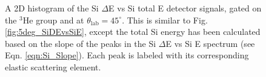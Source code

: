 \begin{figure}[t]
\caption{\label{fig:5deg_SiDEvsSiTotE}A 2D histogram of the Si $\Delta$E vs Si total E detector signals, gated on the $^{3}$He group and at $\theta_{\mathrm{lab}} = 45^{\circ}$. This is similar to Fig. \ref{fig:5deg_SiDEvsSiE}, except the total Si energy has been calculated based on the slope of the peaks in the Si $\Delta$E vs Si E spectrum (see Eqn. \ref{eqn:Si_Slope}). Each peak is labeled with its corresponding elastic scattering element.}
\end{figure}

